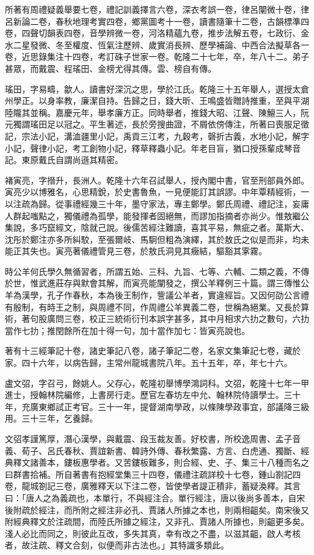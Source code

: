 \begin{pinyinscope}
所著有周禮疑義舉要七卷，禮記訓義擇言六卷，深衣考誤一卷，律呂闡微十卷，律呂新論二卷，春秋地理考實四卷，鄉黨圖考十一卷，讀書隨筆十二卷，古韻標準四卷，四聲切韻表四卷，音學辨微一卷，河洛精蘊九卷，推步法解五卷，七政衍、金水二星發微、冬至權度、恆氣注歷辨、歲實消長辨、歷學補論、中西合法擬草各一卷，近思錄集注十四卷，考訂硃子世家一卷。乾隆二十七年，卒，年八十二。弟子甚眾，而戴震、程瑤田、金榜尤得其傳。雲、榜自有傳。

瑤田，字易疇，歙人。讀書好深沉之思，學於江氏。乾隆三十五年舉人，選授太倉州學正。以身率教，廉潔自持。告歸之日，錢大昕、王鳴盛皆贈詩推重，至與平湖陸隴其並稱。嘉慶元年，舉孝廉方正。同時舉者，推錢大昭、江聲、陳鱣三人，阮元獨謂瑤田足以冠之。平生著述，長於旁搜曲證，不屑依傍傳注，所著曰喪服足徵記，宗法小記，溝洫疆里小記，禹貢三江考，九穀考，磬折古義，水地小記，解字小記，聲律小記，考工創物小記，釋草釋蟲小記。年老目盲，猶口授孫輩成琴音記。東原戴氏自謂尚遜其精密。

褚寅亮，字搢升，長洲人。乾隆十六年召試舉人，授內閣中書，官至刑部員外郎。寅亮少以博雅名，心思精銳，於史書魯魚，一見便能訂其誤謬。中年覃精經術，一以注疏為歸。從事禮經幾三十年，墨守家法，專主鄭學。鄭氏周禮、禮記注，妄庸人群起嗤點之，獨儀禮為孤學，能發揮者固絕無，而謬加指摘者亦尚少。惟敖繼公集說，多巧竄經文，陰就己說。後儒苦經注難讀，喜其平易，無疵之者。萬斯大、沈彤於鄭注亦多所糾駮，至張爾岐、馬駉但粗為演繹，其於敖氏之似是而非，均未能正其失也。寅亮著儀禮管見三卷，於敖氏洞見其癥結，驅豁其雺霧。

時公羊何氏學久無循習者，所謂五始、三科、九旨、七等、六輔、二類之義，不傳於世，惟武進莊存與默會其解，而寅亮能闡發之，撰公羊釋例三十篇。謂三傳惟公羊為漢學，孔子作春秋，本為後王制作，訾議公羊者，實違經旨。又因何劭公言禮有殷制，有時王之制，與周禮不同，作周禮公羊異義二卷，世稱為絕業。又長於算術，著句股廣問三卷，校正三統術衍刊本誤字甚多，其中月相求六扐之數句，六扐當作七扐；推閏餘所在加十得一句，加十當作加七：皆寅亮說也。

著有十三經筆記十卷，諸史筆記八卷，諸子筆記二卷，名家文集筆記七卷，藏於家。四十六年，以病告歸，主常州龍城書院八年。五十五年，卒，年七十六。

盧文弨，字召弓，餘姚人。父存心，乾隆初舉博學鴻詞科。文弨，乾隆十七年一甲進士，授翰林院編修，上書房行走。歷官左春坊左中允、翰林院侍讀學士。三十年，充廣東鄉試正考官。三十一年，提督湖南學政，以條陳學政事宜，部議降三級用。三十三年，乞養歸。

文弨孝謹篤厚，潛心漢學，與戴震、段玉裁友善。好校書，所校逸周書、孟子音義、荀子、呂氏春秋、賈誼新書、韓詩外傳、春秋繁露、方言、白虎通、獨斷、經典釋文諸善本，鏤板惠學者。又苦鏤板難多，則合經、史、子、集三十八種而名之曰群書拾補。所自著書有抱經堂集三十四卷，儀禮注疏詳校十七卷，鍾山劄記四卷，龍城劄記三卷，廣雅釋天以下注二卷，皆使學者諟正積非，蓄疑渙釋。其言曰：「唐人之為義疏也，本單行，不與經注合。單行經注，唐以後尚多善本，自宋後附疏於經注，而所附之經注非必孔、賈諸人所據之本也，則兩相齟矣。南宋後又附經典釋文於注疏間，而陸氏所據之經注，又非孔、賈諸人所據也，則齟更多矣。淺人必比而同之，則彼此互改，多失其真，幸有改之不盡，以滋其齟，啟人考核者，故注疏、釋文合刻，似便而非古法也。」其特識多類此。


\end{pinyinscope}
